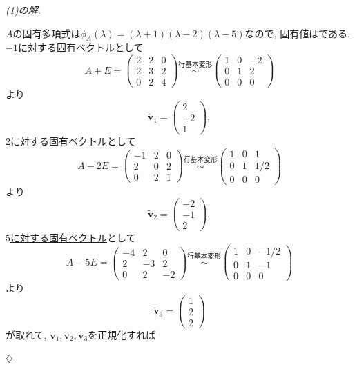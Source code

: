 \documentclass[titlepage]{jsarticle}
\numberwithin{equation}{section}
\newenvironment{kaitou}[1][解]{%
\begin{proofbox}%
\textit{#1. }\ignorespaces
}{%
\hfill$\diamondsuit$%
\end{proofbox}%
}
\begin{document}
\begin{kaitou}[(1)の解]
$A$の固有多項式は$\phi_A(\lambda) = (\lambda + 1)(\lambda - 2)(\lambda-5)$なので, 固有値はである. \uline{$-1$に対する固有ベクトル}として
\[
A+E = 
\begin{pmatrix}
2 & 2 & 0\\
2 & 3 & 2\\
0 & 2 & 4
\end{pmatrix}
\stackrel{\text{行基本変形}}{\sim}
\begin{pmatrix}
1 & 0 & -2\\
0 & 1 & 2\\
0 & 0 & 0
\end{pmatrix}
\]
より
\[
\tilde{\bm{v}}_1 = 
\begin{pmatrix}
2\\
-2\\
1
\end{pmatrix},
\]
\uline{$2$に対する固有ベクトル}として
\[
A - 2E =
\begin{pmatrix}
-1 & 2 & 0\\
2 & 0 & 2\\
0 & 2 & 1
\end{pmatrix}
\stackrel{\text{行基本変形}}{\sim}
\begin{pmatrix}
1 & 0 & 1\\
0 & 1 & 1/2\\
0 & 0& 0
\end{pmatrix}
\]
より
\[
\tilde{\bm{v}}_2 =
\begin{pmatrix}
-2\\
-1\\
2
\end{pmatrix},
\]
\uline{$5$に対する固有ベクトル}として
\[
A - 5E = 
\begin{pmatrix}
-4 & 2 & 0\\
2 & -3 & 2\\
0 & 2 & -2
\end{pmatrix}
\stackrel{\text{行基本変形}}{\sim}
\begin{pmatrix}
1 & 0 & -1/2\\
0 & 1 & -1\\
0 & 0 & 0
\end{pmatrix}
\]
より
\[
\tilde{\bm{v}}_3 = 
\begin{pmatrix}
1\\
2\\
2
\end{pmatrix}
\]
が取れて, $\tilde{\bm{v}}_1, \tilde{\bm{v}}_2, \tilde{\bm{v}}_3$を正規化すれば
\begin{answerbox}

\end{answerbox}
\end{kaitou}
\end{document}
